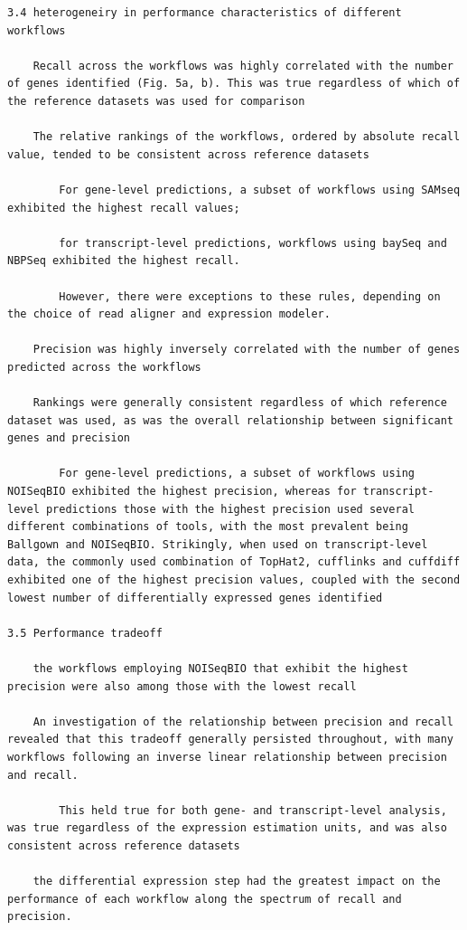 \documentclass[
]{book}
\begin{document}
\begin{verbatim}
3.4 heterogeneiry in performance characteristics of different workflows

    Recall across the workflows was highly correlated with the number of genes identified (Fig. 5a, b). This was true regardless of which of the reference datasets was used for comparison

    The relative rankings of the workflows, ordered by absolute recall value, tended to be consistent across reference datasets

        For gene-level predictions, a subset of workflows using SAMseq exhibited the highest recall values;

        for transcript-level predictions, workflows using baySeq and NBPSeq exhibited the highest recall.

        However, there were exceptions to these rules, depending on the choice of read aligner and expression modeler.

    Precision was highly inversely correlated with the number of genes predicted across the workflows

    Rankings were generally consistent regardless of which reference dataset was used, as was the overall relationship between significant genes and precision

        For gene-level predictions, a subset of workflows using NOISeqBIO exhibited the highest precision, whereas for transcript-level predictions those with the highest precision used several different combinations of tools, with the most prevalent being Ballgown and NOISeqBIO. Strikingly, when used on transcript-level data, the commonly used combination of TopHat2, cufflinks and cuffdiff exhibited one of the highest precision values, coupled with the second lowest number of differentially expressed genes identified

3.5 Performance tradeoff

    the workflows employing NOISeqBIO that exhibit the highest precision were also among those with the lowest recall

    An investigation of the relationship between precision and recall revealed that this tradeoff generally persisted throughout, with many workflows following an inverse linear relationship between precision and recall.

        This held true for both gene- and transcript-level analysis, was true regardless of the expression estimation units, and was also consistent across reference datasets

    the differential expression step had the greatest impact on the performance of each workflow along the spectrum of recall and precision.


\end{verbatim}
\end{document}
